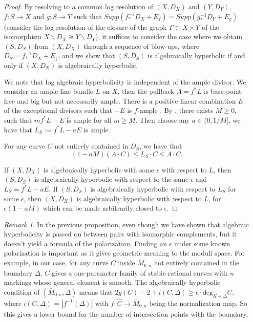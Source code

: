 \documentclass{amsart}
\theoremstyle{definition}
\theoremstyle{remark}
\newtheorem{remark}[theorem]{Remark}
\begin{document}
\begin{proof}
By resolving to a common log resolution of $(X,D_X)$ and $(Y,D_Y)$, $f:S\to X$ and $g:S\to Y$ such that $ Supp(f_*^{-1} D_X + E_f) =Supp(g_*^{-1} D_Y + E_g)$ (consider the log resolution of the closure of the graph $\Gamma \subset X\times Y$ of the isomorphism $X\backslash D_X\cong Y\backslash D_Y$), it suffices to consider the case where we obtain $(S, D_S)$ from $(X,D_X)$ through a sequence of blow-ups, where $D_S = f_*^{-1} D_X + E_f$, and we show that $(S,D_S)$ is algebraically hyperbolic if and only if $(X, D_X)$ is algebraically hyperbolic.

We note that log algebraic hyperbolicity is independent of the ample divisor. We consider an ample line bundle $L$ on $X$, then the pullback $A = f^*L$ is base-point-free and big but not necessarily ample. There is a positive linear combination  $E$ of the exceptional divisors such that $-E$ is $f$-ample \cite[section 44]{Kollar-CanonicalModels-40}.
By \cite[Proposition 1.7.10]{LazarsfeldI}, there exists $M\geq 0$, such that $mf^*L-E$ is ample for all $m\geq M$. Then choose any $a\in (0,1/M]$, we have that $L_S := f^*L - a E$ is ample.

For any curve $C$ not entirely contained in $D_S$, we have that
\[
(1-aM)(A \cdot C) \le L_S \cdot C \le A \cdot C.
\]

If $(X,D_X)$ is algebraically hyperbolic with some $\epsilon$ with respect to $L$, then $(S,D_S)$ is algebraically hyperbolic with respect to the same $\epsilon$ and $L_S = f^*L - aE$. If $(S, D_S)$ is algebraically hyperbolic with respect to $L_S$ for some $\epsilon$, then $(X, D_X)$ is algebraically hyperbolic with respect to $L$, for $\epsilon(1-aM)$ which can be made arbitrarily closed to $\epsilon$.
\end{proof}
\begin{remark}
    In the previous proposition, even though we have shown that algebraic hyperbolicity is passed on between pairs with isomorphic complements, but it doesn't yield a formula of the polarization. Finding an $\epsilon$ under some known polarization is important as it gives geometric meaning to the moduli space. For example, in our case, for any curve $C$ inside $\overline{M}_{0,n}$ not entirely contained in the boundary $\Delta$, $C$ gives a one-parameter family of stable rational curves with $n$ markings whose general element is smooth. The algebraically hyperbolic condition of $(\overline{M}_{0,n}, \Delta)$ means that $2g(C)-2+i(C,\Delta)\geq \epsilon\cdot \mathrm{deg}_{K+\Delta}C$, where $i(C,\Delta)$ = $|f^{-1}(\Delta)|$ with $f:\widehat{C}\to \overline{M}_{0,n} $ being the normalization map. So this gives a lower bound for the number of intersection points with the boundary. 

\end{remark}
\end{document}

